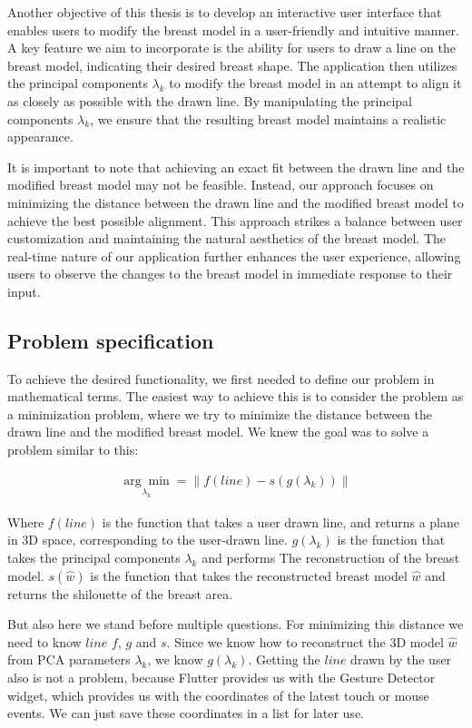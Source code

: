 Another objective of this thesis is to develop an interactive user interface that enables users to modify the breast model in a user-friendly and intuitive manner. A key feature we aim to 
incorporate is the ability for users to draw a line on the breast model, indicating their desired breast shape. The application then utilizes the principal components $\lambda_k$ to modify 
the breast model in an attempt to align it as closely as possible with the drawn line. By manipulating the principal components $\lambda_k$, we ensure that the resulting breast model 
maintains a realistic appearance.

It is important to note that achieving an exact fit between the drawn line and the modified breast model may not be feasible. Instead, our approach focuses on minimizing the distance 
between the drawn line and the modified breast model to achieve the best possible alignment. This approach strikes a balance between user customization and maintaining the natural 
aesthetics of the breast model. The real-time nature of our application further enhances the user experience, allowing users to observe the changes to the breast model in immediate 
response to their input.

\subsection{Problem specification}

To achieve the desired functionality, we first needed to define our problem in mathematical terms. The easiest way to achieve this is to consider the problem as a minimization problem, where
we try to minimize the distance between the drawn line and the modified breast model. We knew the goal was to solve a problem similar to this:

\begin{align}\label{argmin:full}
    \underset{\lambda_k}{\arg\min} = \lVert f(line) - s(g(\lambda_k)) \rVert
\end{align}

Where $f(line)$ is the function that takes a user drawn line, and returns a plane in 3D space, corresponding to the user-drawn line. $g(\lambda_k)$ is the function that takes the principal components $\lambda_k$ and performs The
reconstruction of the breast model. $s(\hat{w})$ is the function that takes the reconstructed breast model $\hat{w}$ and returns the shilouette of the breast area.

But also here we stand before multiple questions. For minimizing this distance we need to know $line$ $f$, $g$ and $s$. Since we know how to reconstruct the 3D model $\hat{w}$ from PCA parameters
$\lambda_k$, we know $g(\lambda_k)$. Getting the $line$ drawn by the user also is not a problem, because Flutter provides us with the Gesture Detector widget, which provides us with the 
coordinates of the latest touch or mouse events. We can just save these coordinates in a list for later use. 

